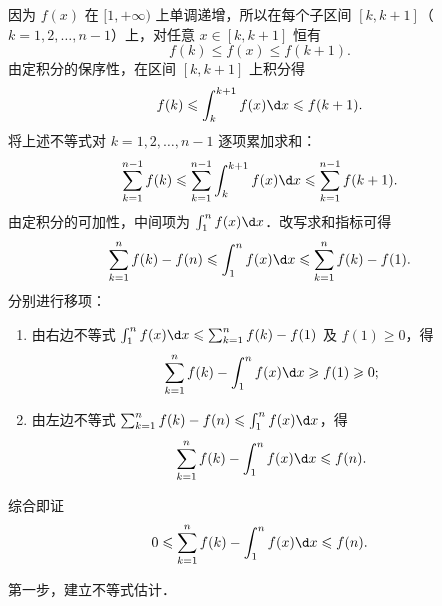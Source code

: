 \begin{solution}

    因为 $f(x)$ 在 $[1, +\infty)$ 上单调递增，所以在每个子区间 $[k, k+1]$（$k = 1, 2, \dots, n-1$）上，对任意 $x \in [k, k+1]$ 恒有
    \begin{equation}
        f(k) \leqslant f(x) \leqslant f(k+1).
    \end{equation}
    由定积分的保序性，在区间 $[k, k+1]$ 上积分得
    \begin{equation}
        f(k) \leqslant \int_k^{k+1} f(x) \d x \leqslant f(k+1).
    \end{equation}
    将上述不等式对 $k = 1, 2, \dots, n-1$ 逐项累加求和：
    \begin{equation}
        \sum_{k=1}^{n-1} f(k) \leqslant \sum_{k=1}^{n-1} \int_k^{k+1} f(x) \d x \leqslant \sum_{k=1}^{n-1} f(k+1).
    \end{equation}
    由定积分的可加性，中间项为 $\int_1^n f(x) \d x$．改写求和指标可得
    \begin{equation}
        \sum_{k=1}^n f(k) - f(n) \leqslant \int_1^n f(x) \d x \leqslant \sum_{k=1}^n f(k) - f(1).
    \end{equation}
    分别进行移项：
    \begin{enumerate}
        \item 由右边不等式 $\int_1^n f(x) \d x \leqslant \sum_{k=1}^n f(k) - f(1)$ 及 $f(1) \geqslant 0$，得
              \begin{equation}
                  \sum_{k=1}^n f(k) - \int_1^n f(x) \d x \geqslant f(1) \geqslant 0;
              \end{equation}
        \item 由左边不等式 $\sum_{k=1}^n f(k) - f(n) \leqslant \int_1^n f(x) \d x$，得
              \begin{equation}
                  \sum_{k=1}^n f(k) - \int_1^n f(x) \d x \leqslant f(n).
              \end{equation}
    \end{enumerate}
    综合即证
    \begin{equation}
        0 \leqslant \sum_{k=1}^n f(k) - \int_1^n f(x) \d x \leqslant f(n).
    \end{equation}


    第一步，建立不等式估计．


\end{solution}

